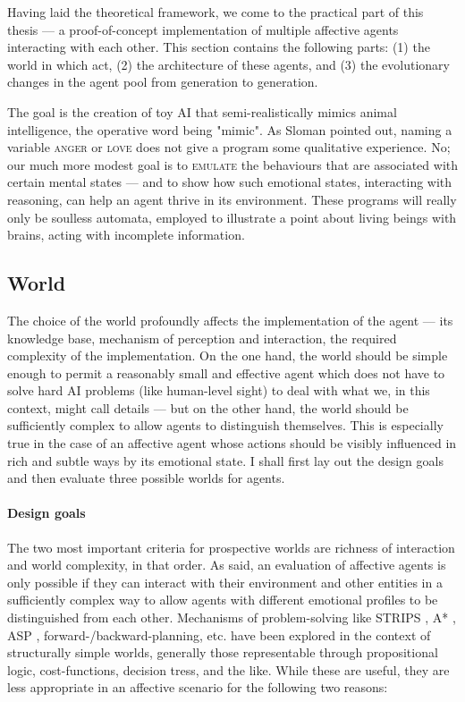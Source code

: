 Having laid the theoretical framework, we come to the practical part of this thesis --- a proof-of-concept implementation of multiple affective agents interacting with each other. This section contains the following parts: (1) the world in which act, (2) the architecture of these agents, and (3) the evolutionary changes in the agent pool from generation to generation.

The goal is the creation of toy AI that semi-realistically mimics animal intelligence, the operative word being "mimic". As Sloman \cite{sloman2000} pointed out, naming a variable \textsc{anger} or \textsc{love} does not give a program some qualitative experience. No; our much more modest goal is to \textsc{emulate} the behaviours that are associated with certain mental states --- and to show how such emotional states, interacting with reasoning, can help an agent thrive in its environment. These programs will really only be soulless automata, employed to illustrate a point about living beings with brains, acting with incomplete information.

\subsection{World}

The choice of the world profoundly affects the implementation of the agent --- its knowledge base, mechanism of perception and interaction, the required complexity of the implementation. On the one hand, the world should be simple enough to permit a reasonably small and effective agent which does not have to solve hard AI problems (like human-level sight) to deal with what we, in this context, might call details --- but on the other hand, the world should be sufficiently complex to allow agents to distinguish themselves. This is especially true in the case of an affective agent whose actions should be visibly influenced in rich and subtle ways by its emotional state. I shall first lay out the design goals and then evaluate three possible worlds for agents.

\paragraph{Design goals} The two most important criteria for prospective worlds are richness of interaction and world complexity, in that order. As said, an evaluation of affective agents is only possible if they can interact with their environment and other entities in a sufficiently complex way to allow agents with different emotional profiles to be distinguished from each other. Mechanisms of problem-solving like STRIPS \cite{fikesNilsson}, A* \cite{nilssonAStar}, ASP \cite{asp1}, forward-/backward-planning, etc. have been explored in the context of structurally simple worlds, generally those representable through propositional logic, cost-functions, decision tress, and the like. While these are useful, they are less appropriate in an affective scenario for the following two reasons:

